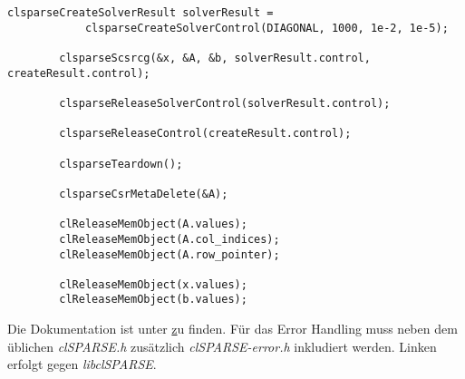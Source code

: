 		\begin{lstlisting}[caption=clSPARSE: Ausführen]
		clsparseCreateSolverResult solverResult = 
			clsparseCreateSolverControl(DIAGONAL, 1000, 1e-2, 1e-5);
		
		clsparseScsrcg(&x, &A, &b, solverResult.control, createResult.control);
		
		clsparseReleaseSolverControl(solverResult.control);
    
		clsparseReleaseControl(createResult.control);
		
		clsparseTeardown();  
		  
		clsparseCsrMetaDelete(&A);
		
		clReleaseMemObject(A.values);
		clReleaseMemObject(A.col_indices);
		clReleaseMemObject(A.row_pointer);

		clReleaseMemObject(x.values);
		clReleaseMemObject(b.values);
    	\end{lstlisting}
    	
    	Die Dokumentation ist unter \href{http://clmathlibraries.github.io/clSPARSE/} zu finden. Für das Error Handling muss neben dem üblichen \textit{clSPARSE.h} zusätzlich \textit{clSPARSE-error.h} inkludiert werden. Linken erfolgt gegen \textit{libclSPARSE}.
			